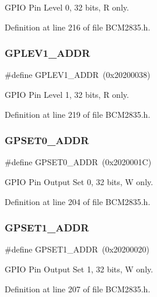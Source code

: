 G\+P\+IO Pin Level 0, 32 bits, R only. 



Definition at line 216 of file B\+C\+M2835.\+h.

\mbox{\label{group__GPIO_gafd408bfb4a12c49e73389a9004c532a0}} 
\subsubsection{\texorpdfstring{G\+P\+L\+E\+V1\+\_\+\+A\+D\+DR}{GPLEV1\_ADDR}}
{\footnotesize\ttfamily \#define G\+P\+L\+E\+V1\+\_\+\+A\+D\+DR~(0x20200038)}



G\+P\+IO Pin Level 1, 32 bits, R only. 



Definition at line 219 of file B\+C\+M2835.\+h.

\mbox{\label{group__GPIO_ga226a4472dd8e6b8cbb47961287241ea1}} 
\subsubsection{\texorpdfstring{G\+P\+S\+E\+T0\+\_\+\+A\+D\+DR}{GPSET0\_ADDR}}
{\footnotesize\ttfamily \#define G\+P\+S\+E\+T0\+\_\+\+A\+D\+DR~(0x2020001\+C)}



G\+P\+IO Pin Output Set 0, 32 bits, W only. 



Definition at line 204 of file B\+C\+M2835.\+h.

\mbox{\label{group__GPIO_gaaece09379857ff0604275597943a0cd4}} 
\subsubsection{\texorpdfstring{G\+P\+S\+E\+T1\+\_\+\+A\+D\+DR}{GPSET1\_ADDR}}
{\footnotesize\ttfamily \#define G\+P\+S\+E\+T1\+\_\+\+A\+D\+DR~(0x20200020)}



G\+P\+IO Pin Output Set 1, 32 bits, W only. 



Definition at line 207 of file B\+C\+M2835.\+h.

